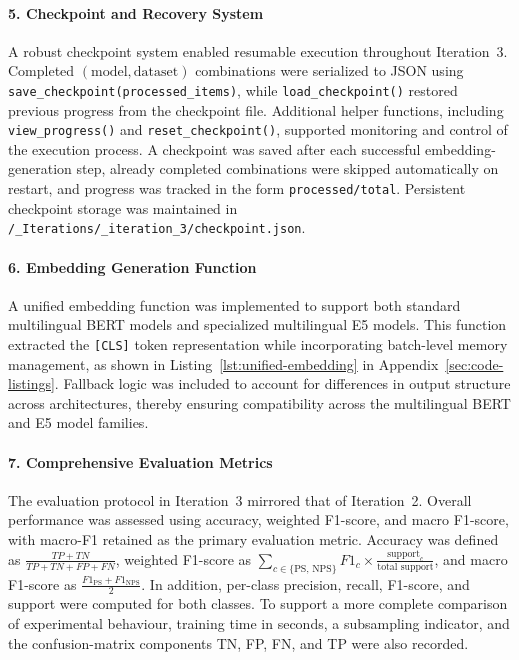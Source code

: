 \documentclass[11pt, titlepage, bibliography=totoc]{scrreprt}
\begin{document}
\paragraph{5. Checkpoint and Recovery System}
A robust checkpoint system enabled resumable execution throughout Iteration~3. Completed \((\text{model}, \text{dataset})\) combinations were serialized to JSON using \texttt{save\_checkpoint(processed\_items)}, while \texttt{load\_checkpoint()} restored previous progress from the checkpoint file. Additional helper functions, including \texttt{view\_progress()} and \texttt{reset\_checkpoint()}, supported monitoring and control of the execution process. A checkpoint was saved after each successful embedding-generation step, already completed combinations were skipped automatically on restart, and progress was tracked in the form \texttt{processed/total}. Persistent checkpoint storage was maintained in \texttt{/\_Iterations/\_iteration\_3/checkpoint.json}.

\paragraph{6. Embedding Generation Function}
A unified embedding function was implemented to support both standard multilingual BERT models and specialized multilingual E5 models. This function extracted the \texttt{[CLS]} token representation while incorporating batch-level memory management, as shown in Listing~\ref{lst:unified-embedding} in Appendix~\ref{sec:code-listings}. Fallback logic was included to account for differences in output structure across architectures, thereby ensuring compatibility across the multilingual BERT and E5 model families.

\paragraph{7. Comprehensive Evaluation Metrics}
The evaluation protocol in Iteration~3 mirrored that of Iteration~2. Overall performance was assessed using accuracy, weighted F1-score, and macro F1-score, with macro-F1 retained as the primary evaluation metric. Accuracy was defined as \(\frac{TP + TN}{TP + TN + FP + FN}\), weighted F1-score as \(\sum_{c \in \{\text{PS, NPS}\}} F1_c \times \frac{\text{support}_c}{\text{total support}}\), and macro F1-score as \(\frac{F1_{\text{PS}} + F1_{\text{NPS}}}{2}\). In addition, per-class precision, recall, F1-score, and support were computed for both classes. To support a more complete comparison of experimental behaviour, training time in seconds, a subsampling indicator, and the confusion-matrix components TN, FP, FN, and TP were also recorded.
\end{document}
